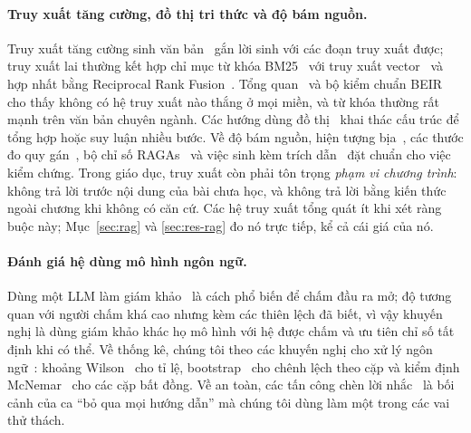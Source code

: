 \paragraph{Truy xuất tăng cường, đồ thị tri thức và độ bám nguồn.}
Truy xuất tăng cường sinh văn bản~\cite{lewis2020} gắn lời sinh với các đoạn truy xuất được; truy xuất lai thường kết hợp chỉ mục từ khóa BM25~\cite{robertson2009} với truy xuất vector~\cite{karpukhin2020} và hợp nhất bằng Reciprocal Rank Fusion~\cite{cormack2009}. Tổng quan~\cite{gao2023survey} và bộ kiểm chuẩn BEIR~\cite{thakur2021} cho thấy không có hệ truy xuất nào thắng ở mọi miền, và từ khóa thường rất mạnh trên văn bản chuyên ngành. Các hướng dùng đồ thị~\cite{edge2024} khai thác cấu trúc để tổng hợp hoặc suy luận nhiều bước. Về độ bám nguồn, hiện tượng bịa~\cite{ji2023}, các thước đo quy gán~\cite{rashkin2023}, bộ chỉ số RAGAs~\cite{es2024} và việc sinh kèm trích dẫn~\cite{gao2023alce} đặt chuẩn cho việc kiểm chứng. Trong giáo dục, truy xuất còn phải tôn trọng \emph{phạm vi chương trình}: không trả lời trước nội dung của bài chưa học, và không trả lời bằng kiến thức ngoài chương khi không có căn cứ. Các hệ truy xuất tổng quát ít khi xét ràng buộc này; Mục~\ref{sec:rag} và \ref{sec:res-rag} đo nó trực tiếp, kể cả cái giá của nó.

\paragraph{Đánh giá hệ dùng mô hình ngôn ngữ.}
Dùng một LLM làm giám khảo~\cite{zheng2023} là cách phổ biến để chấm đầu ra mở; độ tương quan với người chấm khá cao nhưng kèm các thiên lệch đã biết, vì vậy khuyến nghị là dùng giám khảo khác họ mô hình với hệ được chấm và ưu tiên chỉ số tất định khi có thể. Về thống kê, chúng tôi theo các khuyến nghị cho xử lý ngôn ngữ~\cite{dror2018}: khoảng Wilson~\cite{wilson1927} cho tỉ lệ, bootstrap~\cite{efron1993} cho chênh lệch theo cặp và kiểm định McNemar~\cite{mcnemar1947} cho các cặp bất đồng. Về an toàn, các tấn công chèn lời nhắc~\cite{perez2022,greshake2023} là bối cảnh của ca ``bỏ qua mọi hướng dẫn'' mà chúng tôi dùng làm một trong các vai thử thách.

